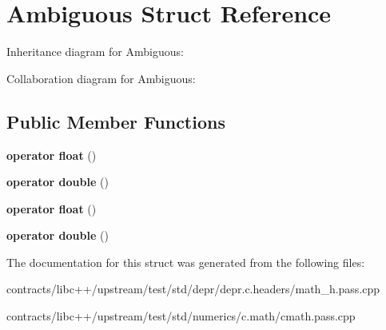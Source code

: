 \hypertarget{struct_ambiguous}{}\section{Ambiguous Struct Reference}
\label{struct_ambiguous}


Inheritance diagram for Ambiguous\+:


Collaboration diagram for Ambiguous\+:
\subsection*{Public Member Functions}
\begin{DoxyCompactItemize}
\item 
\mbox{\label{struct_ambiguous_a02953f3c39dbf57c9a6c0abd49f5fa8f}} 
{\bfseries operator float} ()
\item 
\mbox{\label{struct_ambiguous_ae21e7a1b315b4280cadbeb3ec4e28d3d}} 
{\bfseries operator double} ()
\item 
\mbox{\label{struct_ambiguous_a02953f3c39dbf57c9a6c0abd49f5fa8f}} 
{\bfseries operator float} ()
\item 
\mbox{\label{struct_ambiguous_ae21e7a1b315b4280cadbeb3ec4e28d3d}} 
{\bfseries operator double} ()
\end{DoxyCompactItemize}


The documentation for this struct was generated from the following files\+:\begin{DoxyCompactItemize}
\item 
contracts/libc++/upstream/test/std/depr/depr.\+c.\+headers/math\+\_\+h.\+pass.\+cpp\item 
contracts/libc++/upstream/test/std/numerics/c.\+math/cmath.\+pass.\+cpp\end{DoxyCompactItemize}
